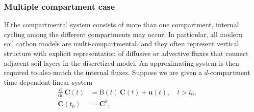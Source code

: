 \documentclass[11pt,a4paper]{article}
\renewcommand{\vec}[1]{\mathbf{#1}}
\newcommand{\tens}[1]{\mathrm{#1}}
\newcommand{\deriv}[1]{\frac{\mathrm{d}}{\mathrm{d}#1}}
\begin{document}
    \subsubsection{Multiple compartment case}
        If the compartmental system consists of more than one compartment, internal cycling among the different compartments may occur. In particular, all modern soil carbon models are multi-compartmental, and they often represent vertical structure with explicit representation of diffusive or advective fluxes that connect adjacent soil layers in the discretized model.
        An approximating system is then required to also match the internal fluxes.
        Suppose we are given a $d$-compartment time-dependent linear system
        \begin{equation}\label{eqn:CS_multi_dim}
            \begin{aligned}
                \deriv{t}\,\vec{C}(t) &= \tens{B}(t)\,\vec{C}(t) + \vec{u}(t),\quad t>t_0,\\
                \vec{C}(t_0) &= \vec{C}^0,
            \end{aligned}
        \end{equation}
\end{document}
